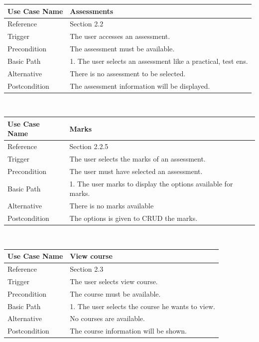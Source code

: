 \documentclass[10pt,a4paper]{article}
\begin{document}
  
                \begin{tabular}{|l|l|}\hline
                        Use Case Name   & Assessments \\\hline
                        Reference & Section 2.2\\\hline
                        Trigger & The user accesses an assessment.\\\hline
                        Precondition & The assessment must be available.\\\hline
                        Basic Path & 1.	The user selects an assessment like a practical, test ens.\\\hline
                        Alternative & There is no assessment to be selected.\\\hline
                        Postcondition & The assessment information will be displayed.\\\hline
                \end{tabular}\\\linebreak
                
                \begin{tabular}{|l|l|}\hline
                        Use Case Name   & Marks \\\hline
                        Reference & Section 2.2.5\\\hline
                        Trigger & The user selects the marks of an assessment.\\\hline
                        Precondition & The user must have selected an assessment.\\\hline
                        Basic Path & 1.	The user marks to display the options available for marks.\\\hline
                        Alternative & There is no marks available\\\hline
                        Postcondition & The options is given to CRUD the marks.\\\hline
                \end{tabular}\\\linebreak
                
                \begin{tabular}{|l|l|}\hline
                        Use Case Name   & View course \\\hline
                        Reference & Section 2.3\\\hline
                        Trigger & The user selects view course.\\\hline
                        Precondition & The course must be available.\\\hline
                        Basic Path & 1.	The user selects the course he wants to view.\\\hline
                        Alternative & No courses are available.\\\hline
                        Postcondition & The course information will be shown.\\\hline
                \end{tabular}\\\linebreak
                
\end{document}
